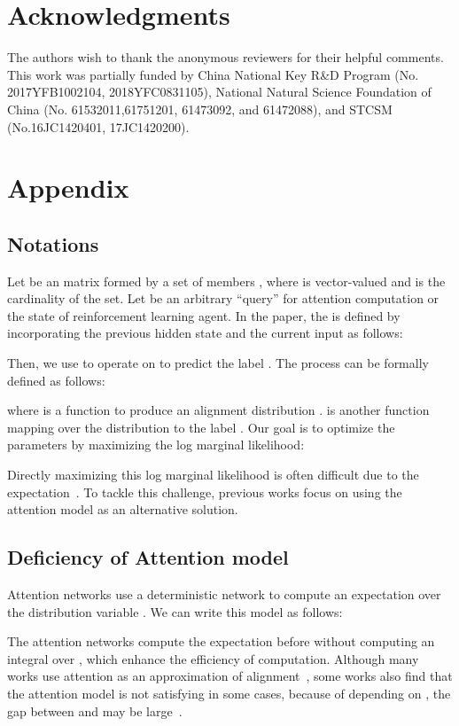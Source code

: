 \documentclass[letterpaper]{article} \usepackage{aaai19}  \usepackage{times}  \usepackage{helvet}  \usepackage{courier}  \usepackage{url}  \usepackage{graphicx}  \usepackage{amsmath}
\begin{document}
\section{Acknowledgments}
The authors wish to thank the anonymous reviewers for their helpful comments. This work was partially funded by China National Key R\&D Program (No. 2017YFB1002104, 2018YFC0831105), National Natural Science Foundation of China (No. 61532011,61751201, 61473092, and 61472088), and STCSM (No.16JC1420401, 17JC1420200).

\section{Appendix}

\subsection{Notations}
Let  be an matrix formed by a set of members , where  is vector-valued and  is the cardinality of the set. Let  be an arbitrary ``query'' for attention computation or the state of reinforcement learning agent. In the paper, the  is defined by incorporating the previous hidden state  and the current input  as follows:


Then, we use  to operate on  to predict the label . The process can be formally defined as follows:

where  is a function to produce an alignment distribution .  is another function mapping  over the distribution  to the label . Our goal is to optimize the parameters  by maximizing the log marginal likelihood:

Directly maximizing this log marginal likelihood is often difficult due to the expectation~\cite{deng2018latent}. To tackle this challenge, previous works focus on using the attention model as an alternative solution.

\subsection{Deficiency of Attention model}
Attention networks use a deterministic network to compute an expectation over the distribution variable . We can write this model as follows:

The attention networks compute the expectation before  without computing an integral over , which enhance the efficiency of computation. Although many works use attention as an approximation of alignment~\cite{cohn2016incorporating,tu2016modeling}, some works also find that the attention model is not satisfying in some cases\cite{xu2015show}, because of depending on , the gap between  and  may be large~\cite{deng2018latent}.
\end{document}
